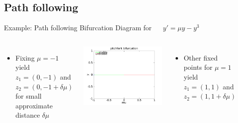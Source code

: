 \documentclass{beamer}
\begin{document}
\subsection{Path following}
\begin{frame}{Example: Path following}
    Bifurcation Diagram for ~~ $y' = \mu y - y^3 $
    \begin{columns}
        \begin{itemize}
            \item Fixing $\mu = -1$ yield $z_{1} = (0, -1)$ and $z_{2} = (0, -1 + \delta \mu)${}
            for small approximate distance $\delta\mu$
            \\
        \end{itemize}
        \pause
        \includegraphics[width=1\textwidth]{grafik/pfexample1}
        \pause
        \begin{itemize}
            \item Other fixed points for $\mu = 1$ yield $z_{1} = (1, 1)$ and $z_{2} = (1, 1 + \delta \mu)$
            \\
        \end{itemize}
        ~\\
        ~\\
        

\end{columns}
\end{frame}
\end{document}
